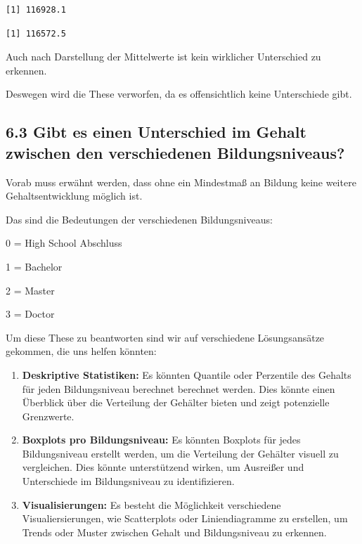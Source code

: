\documentclass[
  letterpaper,
  DIV=11,
  numbers=noendperiod]{scrartcl}
\newenvironment{Shaded}{\begin{snugshade}}{\end{snugshade}}
\newcommand{\AttributeTok}[1]{\textcolor[rgb]{0.40,0.45,0.13}{#1}}
\newcommand{\ConstantTok}[1]{\textcolor[rgb]{0.56,0.35,0.01}{#1}}
\newcommand{\DecValTok}[1]{\textcolor[rgb]{0.68,0.00,0.00}{#1}}
\newcommand{\FunctionTok}[1]{\textcolor[rgb]{0.28,0.35,0.67}{#1}}
\newcommand{\NormalTok}[1]{\textcolor[rgb]{0.00,0.23,0.31}{#1}}
\newcommand{\OtherTok}[1]{\textcolor[rgb]{0.00,0.23,0.31}{#1}}
\newcommand{\SpecialCharTok}[1]{\textcolor[rgb]{0.37,0.37,0.37}{#1}}
\begin{document}
\begin{verbatim}
[1] 116928.1
\end{verbatim}

\begin{Shaded}
\end{Shaded}

\begin{verbatim}
[1] 116572.5
\end{verbatim}

Auch nach Darstellung der Mittelwerte ist kein wirklicher Unterschied zu
erkennen.

Deswegen wird die These verworfen, da es offensichtlich keine
Unterschiede gibt.

\hypertarget{gibt-es-einen-unterschied-im-gehalt-zwischen-den-verschiedenen-bildungsniveaus}{%
\subsection{6.3 Gibt es einen Unterschied im Gehalt zwischen den
verschiedenen
Bildungsniveaus?}\label{gibt-es-einen-unterschied-im-gehalt-zwischen-den-verschiedenen-bildungsniveaus}}

Vorab muss erwähnt werden, dass ohne ein Mindestmaß an Bildung keine
weitere Gehaltsentwicklung möglich ist.

Das sind die Bedeutungen der verschiedenen Bildungsniveaus:

0 = High School Abschluss

1 = Bachelor

2 = Master

3 = Doctor

Um diese These zu beantworten sind wir auf verschiedene Lösungsansätze
gekommen, die uns helfen könnten:

\begin{enumerate}
\def\labelenumi{\arabic{enumi}.}
\item
  \textbf{Deskriptive Statistiken:} Es könnten Quantile oder Perzentile
  des Gehalts für jeden Bildungsniveau berechnet berechnet werden. Dies
  könnte einen Überblick über die Verteilung der Gehälter bieten und
  zeigt potenzielle Grenzwerte.
\item
  \textbf{Boxplots pro Bildungsniveau:} Es könnten Boxplots für jedes
  Bildungsniveau erstellt werden, um die Verteilung der Gehälter visuell
  zu vergleichen. Dies könnte unterstützend wirken, um Ausreißer und
  Unterschiede im Bildungsniveau zu identifizieren.
\item
  \textbf{Visualisierungen:} Es besteht die Möglichkeit verschiedene
  Visualiersierungen, wie Scatterplots oder Liniendiagramme zu
  erstellen, um Trends oder Muster zwischen Gehalt und Bildungsniveau zu
  erkennen.
\end{enumerate}
\end{document}
